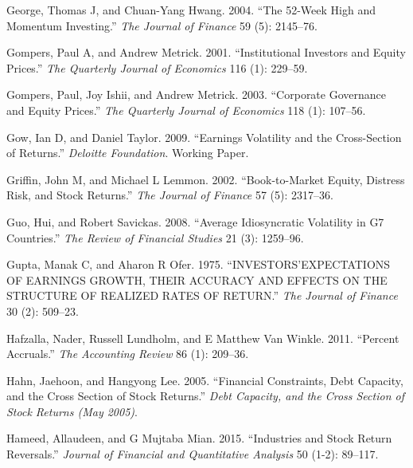 \documentclass[
  letterpaper,
  DIV=11,
  numbers=noendperiod]{scrreprt}
\newlength{\cslhangindent}
\newlength{\cslentryspacingunit} %
\newenvironment{CSLReferences}[2] %
 {%
  \setlength{\parindent}{0pt}
  \ifodd #1
  \let\oldpar\par
  \def\par{\hangindent=\cslhangindent\oldpar}
  \fi
  \setlength{\parskip}{#2\cslentryspacingunit}
 }%
 {}
\begin{document}
\begin{CSLReferences}{1}{0}
\leavevmode{}%
George, Thomas J, and Chuan-Yang Hwang. 2004. {``The 52-Week High and
Momentum Investing.''} \emph{The Journal of Finance} 59 (5): 2145--76.

\leavevmode{}%
Gompers, Paul A, and Andrew Metrick. 2001. {``Institutional Investors
and Equity Prices.''} \emph{The Quarterly Journal of Economics} 116 (1):
229--59.

\leavevmode{}%
Gompers, Paul, Joy Ishii, and Andrew Metrick. 2003. {``Corporate
Governance and Equity Prices.''} \emph{The Quarterly Journal of
Economics} 118 (1): 107--56.

\leavevmode{}%
Gow, Ian D, and Daniel Taylor. 2009. {``Earnings Volatility and the
Cross-Section of Returns.''} \emph{Deloitte Foundation}. Working Paper.

\leavevmode{}%
Griffin, John M, and Michael L Lemmon. 2002. {``Book-to-Market Equity,
Distress Risk, and Stock Returns.''} \emph{The Journal of Finance} 57
(5): 2317--36.

\leavevmode{}%
Guo, Hui, and Robert Savickas. 2008. {``Average Idiosyncratic Volatility
in G7 Countries.''} \emph{The Review of Financial Studies} 21 (3):
1259--96.

\leavevmode{}%
Gupta, Manak C, and Aharon R Ofer. 1975. {``INVESTORS'EXPECTATIONS OF
EARNINGS GROWTH, THEIR ACCURACY AND EFFECTS ON THE STRUCTURE OF REALIZED
RATES OF RETURN.''} \emph{The Journal of Finance} 30 (2): 509--23.

\leavevmode{}%
Hafzalla, Nader, Russell Lundholm, and E Matthew Van Winkle. 2011.
{``Percent Accruals.''} \emph{The Accounting Review} 86 (1): 209--36.

\leavevmode{}%
Hahn, Jaehoon, and Hangyong Lee. 2005. {``Financial Constraints, Debt
Capacity, and the Cross Section of Stock Returns.''} \emph{Debt
Capacity, and the Cross Section of Stock Returns (May 2005)}.

\leavevmode{}%
Hameed, Allaudeen, and G Mujtaba Mian. 2015. {``Industries and Stock
Return Reversals.''} \emph{Journal of Financial and Quantitative
Analysis} 50 (1-2): 89--117.


\end{CSLReferences}
\end{document}
